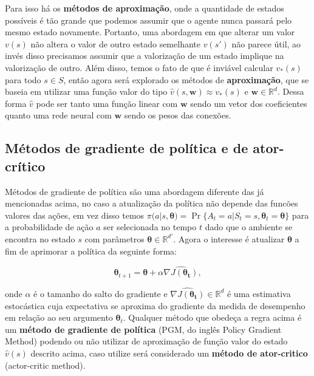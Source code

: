 Para isso há os \textbf{métodos de aproximação}, onde a quantidade de estados possíveis é tão grande que podemos assumir que o agente nunca passará pelo mesmo estado novamente. Portanto, uma abordagem em que alterar um valor $v(s)$ não altera o valor de outro estado semelhante $v(s')$ não parece útil, ao invés disso precisamos assumir que a valorização de um estado implique na valorização de outro. Além disso, temos o fato de que é inviável calcular  $v_\ast(s)$ para todo $s \in S$, então agora será explorado os métodos de \textbf{aproximação}, que se baseia em utilizar uma função valor do tipo $\hat{v}(s, \mathbf{w}) \approx v_\ast(s)$ e $\mathbf{w} \in \mathbb{R}^d$. Dessa forma $\hat{v}$ pode ser tanto uma função linear com $\mathbf{w}$ sendo um vetor dos coeficientes quanto uma rede neural com $\mathbf{w}$ sendo os pesos das conexões.

\subsection{Métodos de gradiente de política e de ator-crítico}
Métodos de gradiente de política são uma abordagem diferente das já mencionadas acima, no caso a atualização da política não depende das funcões valores das ações, em vez disso temos $\pi(a|s, \mathbf{\theta}) = \Pr\{A_t = a | S_t = s, \mathbf{\theta}_t = \mathbf{\theta}\}$ para  a probabilidade de ação $a$ ser selecionada  no tempo $t$ dado que o ambiente se encontra no estado $s$ com parâmetros $\mathbf{\theta} \in \mathbb{R}^{d'}$. Agora o interesse é atualizar $\mathbf{\theta}$ a fim de aprimorar a política da seguinte forma:

\begin{equation}
   \mathbf{\theta}_{t+1} = \mathbf{\theta} + \alpha \widehat{\nabla J (\mathbf{\theta_t})},
\end{equation}

onde $\alpha$ é o tamanho do salto do gradiente e $\widehat{\nabla J (\mathbf{\theta_t})} \in \mathbb{R}^d$ é uma estimativa estocástica cuja expectativa se aproxima do gradiente da medida de desempenho em relação ao seu argumento $\mathbf{\theta}_t$. Qualquer método que obedeça a regra acima é um \textbf{método de gradiente de política} (PGM, do inglês Policy Gradient Method) podendo ou não utilizar de aproximação de função valor do estado $\hat{v}(s)$ descrito acima, caso utilize será considerado um \textbf{método de ator-critico} (actor-critic method). 

